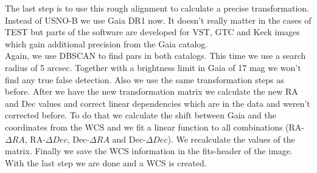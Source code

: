 The last step is to use this rough alignment to calculate a precise transformation. Instead of USNO-B we use Gaia DR1 now. It doesn't really matter in the cases of TEST but parts of the software are developed for VST, GTC and Keck images which gain additional precision from the Gaia catalog.\\
Again, we use DBSCAN to find pars in both catalogs. This time we use a search radius of 5 arcsec. Together with a brightness limit in Gaia of 17 mag we won't find any true false detection. Also we use the same transformation steps as before. After we have the new transformation matrix we calculate the new RA and Dec values and correct linear dependencies which are in the data and weren't corrected before. To do that we calculate the shift between Gaia and the coordinates from the WCS and we fit a linear function to all combinations (RA-$\Delta RA$, RA-$\Delta Dec$, Dec-$\Delta RA$ and Dec-$\Delta Dec$). We recalculate the values of the matrix. Finally we save the WCS information in the fits-header of the image.\\
 With the last step we are done and a WCS is created.

